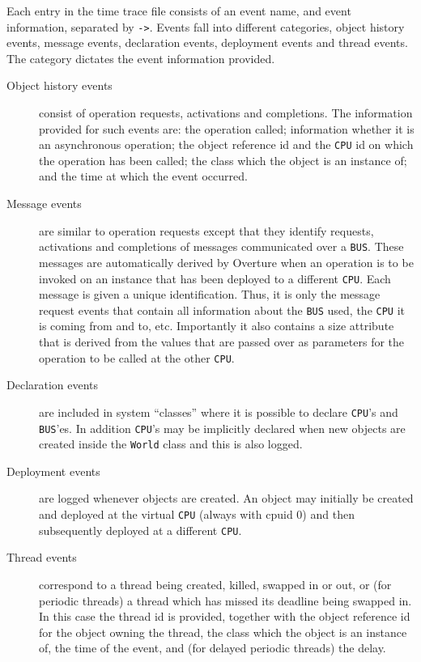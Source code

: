 \documentclass{overturerepchap}
\begin{document}
Each entry in the time trace file consists of an event name, and event
information, separated by \texttt{->}. Events fall into different
categories, object history events, message events, declaration events,
deployment events and thread events. The category
dictates the event information provided.

\begin{description}
\item[Object history events] consist of operation requests, activations and
completions. The information provided for such events are: the
operation called; information whether it is an asynchronous operation;
the object reference id and the \texttt{CPU} id on which the operation has
been called; the class which the object is an instance of; and the
time at which the event occurred.

\item[Message events] are similar to operation requests except that they
    identify requests, activations and completions of messages communicated
    over a \texttt{BUS}. These messages are automatically derived by 
    Overture when an operation is to be invoked on an instance that has been
    deployed to a different \texttt{CPU}. Each message is given a unique
    identification. Thus, it is only the message request events that contain
    all information about the \texttt{BUS} used, the \texttt{CPU} it is 
    coming from and to, etc. Importantly it also contains a size attribute
    that is derived from the values that are passed over as parameters for
    the operation to be called at the other \texttt{CPU}. 

\item[Declaration events] are included in system ``classes'' where
    it is possible to declare
    \texttt{CPU}'s and \texttt{BUS}'es. In addition \texttt{CPU}'s may be
    implicitly declared when new objects are created inside the \texttt{World}
    class and this is also logged.

\item[Deployment events] are logged whenever objects are created. 
     An object may initially be created and deployed at the virtual 
     \texttt{CPU} (always with cpuid 0) and then subsequently deployed
     at a different \texttt{CPU}.

\item[Thread events] correspond to a thread being created, killed,
swapped in or out, or (for
periodic threads) a thread which has missed its deadline being swapped
in. In this case the thread id is provided, together with the object
reference id for the object owning the thread, the class which the
object is an instance of, the time of the event, and (for delayed
periodic threads) the delay.
\end{description}
\end{document}
